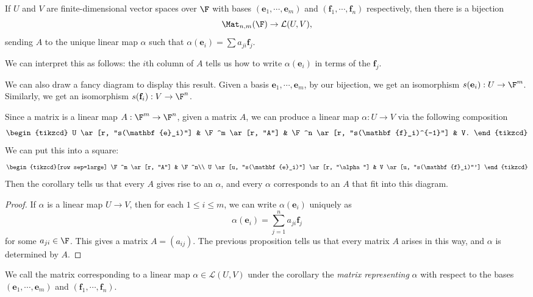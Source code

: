 \documentclass[a4paper]{article}
\begin{document}
\begin{cor}
  If $U$ and $V$ are finite-dimensional vector spaces over $\F$ with bases $(\mathbf{e}_1, \cdots, \mathbf{e}_m)$ and $(\mathbf{f}_1, \cdots, \mathbf{f}_n)$ respectively, then there is a bijection
  \[
    \Mat_{n, m}(\F) \to \mathcal{L}(U, V),
  \]
  sending $A$ to the unique linear map $\alpha$ such that $\alpha(\mathbf{e}_i) = \sum a_{ji} \mathbf{f}_j$.
\end{cor}
We can interpret this as follows: the $i$th column of $A$ tells us how to write $\alpha (\mathbf{e}_i)$ in terms of the $\mathbf{f}_j$.

We can also draw a fancy diagram to display this result. Given a basis $\mathbf{e}_1, \cdots, \mathbf{e}_m$, by our bijection, we get an isomorphism $s(\mathbf{e}_i): U\to \F^m$. Similarly, we get an isomorphism $s(\mathbf{f}_i): V\to \F^n$.

Since a matrix is a linear map $A: \F^m \to \F^n$, given a matrix $A$, we can produce a linear map $\alpha: U\to V$ via the following composition
\[
  \begin{tikzcd}
    U \ar[r, "s(\mathbf{e}_i)"] & \F^m \ar[r, "A"] & \F^n \ar[r, "s(\mathbf{f}_i)^{-1}"] & V.
  \end{tikzcd}
\]
We can put this into a square:
\[
  \begin{tikzcd}[row sep=large]
    \F^m \ar[r, "A"] & \F^n\\
    U \ar[u, "s(\mathbf{e}_i)"] \ar[r, "\alpha"] & V \ar[u, "s(\mathbf{f}_i)"']
  \end{tikzcd}
\]
Then the corollary tells us that every $A$ gives rise to an $\alpha$, and every $\alpha$ corresponds to an $A$ that fit into this diagram.
\begin{proof}
  If $\alpha$ is a linear map $U \to V$, then for each $1 \leq i \leq m$, we can write $\alpha(\mathbf{e}_i)$ uniquely as
  \[
    \alpha(\mathbf{e}_i) = \sum_{j = 1}^n a_{ji} \mathbf{f}_j
  \]
  for some $a_{ji} \in \F$. This gives a matrix $A = (a_{ij})$. The previous proposition tells us that every matrix $A$ arises in this way, and $\alpha$ is determined by $A$.
\end{proof}

\begin{defi}
  We call the matrix corresponding to a linear map $\alpha\in \mathcal{L}(U, V)$ under the corollary the \emph{matrix representing} $\alpha$ with respect to the bases $(\mathbf{e}_1, \cdots, \mathbf{e}_m)$ and $(\mathbf{f}_1, \cdots, \mathbf{f}_n)$.
\end{defi}
\end{document}
